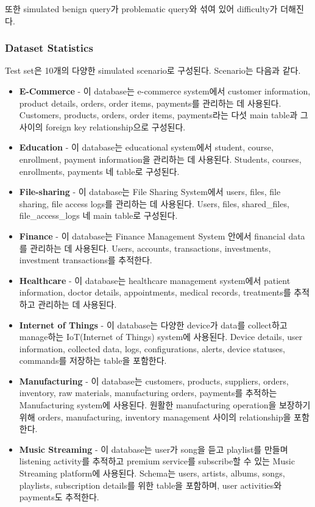 또한 simulated benign query가 problematic query와 섞여 있어 difficulty가 더해진다.


\subsubsection{Dataset Statistics}

Test set은 10개의 다양한 simulated scenario로 구성된다. Scenario는 다음과 같다.

\begin{itemize}
    \item \textbf{E-Commerce} - 이 database는 e-commerce system에서 customer information, product details, orders, order items, payments를 관리하는 데 사용된다. Customers, products, orders, order items, payments라는 다섯 main table과 그 사이의 foreign key relationship으로 구성된다.
    \item \textbf{Education} - 이 database는 educational system에서 student, course, enrollment, payment information을 관리하는 데 사용된다. Students, courses, enrollments, payments 네 table로 구성된다.
    \item \textbf{File-sharing} - 이 database는 File Sharing System에서 users, files, file sharing, file access logs를 관리하는 데 사용된다. Users, files, shared\_files, file\_access\_logs 네 main table로 구성된다.
    \item \textbf{Finance} - 이 database는 Finance Management System 안에서 financial data를 관리하는 데 사용된다. Users, accounts, transactions, investments, investment transactions를 추적한다.
    \item \textbf{Healthcare} - 이 database는 healthcare management system에서 patient information, doctor details, appointments, medical records, treatments를 추적하고 관리하는 데 사용된다.
    \item \textbf{Internet of Things} - 이 database는 다양한 device가 data를 collect하고 manage하는 IoT(Internet of Things) system에 사용된다. Device details, user information, collected data, logs, configurations, alerts, device statuses, commands를 저장하는 table을 포함한다.
    \item \textbf{Manufacturing} - 이 database는 customers, products, suppliers, orders, inventory, raw materials, manufacturing orders, payments를 추적하는 Manufacturing system에 사용된다. 원활한 manufacturing operation을 보장하기 위해 orders, manufacturing, inventory management 사이의 relationship을 포함한다.
    \item \textbf{Music Streaming} - 이 database는 user가 song을 듣고 playlist를 만들며 listening activity를 추적하고 premium service를 subscribe할 수 있는 Music Streaming platform에 사용된다. Schema는 users, artists, albums, songs, playlists, subscription details를 위한 table을 포함하며, user activities와 payments도 추적한다.

\end{itemize}
